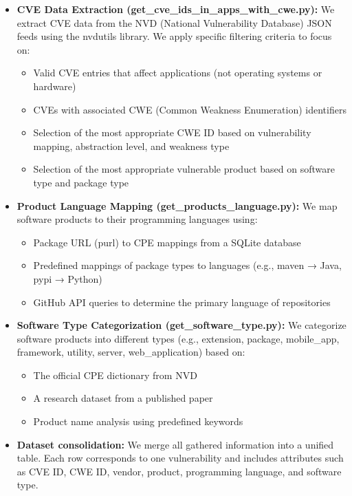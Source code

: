 \begin{itemize}
    \item \textbf{CVE Data Extraction (get\_cve\_ids\_in\_apps\_with\_cwe.py):} We extract CVE data from the NVD (National Vulnerability Database) JSON feeds using the nvdutils library. We apply specific filtering criteria to focus on:
    \begin{itemize}
        \item Valid CVE entries that affect applications (not operating systems or hardware)
        \item CVEs with associated CWE (Common Weakness Enumeration) identifiers
        \item Selection of the most appropriate CWE ID based on vulnerability mapping, abstraction level, and weakness type
        \item Selection of the most appropriate vulnerable product based on software type and package type
    \end{itemize}
    
    \item \textbf{Product Language Mapping (get\_products\_language.py):} We map software products to their programming languages using:
    \begin{itemize}
        \item Package URL (purl) to CPE mappings from a SQLite database
        \item Predefined mappings of package types to languages (e.g., maven → Java, pypi → Python)
        \item GitHub API queries to determine the primary language of repositories
    \end{itemize}
    
    \item \textbf{Software Type Categorization (get\_software\_type.py):} We categorize software products into different types (e.g., extension, package, mobile\_app, framework, utility, server, web\_application) based on:
    \begin{itemize}
        \item The official CPE dictionary from NVD
        \item A research dataset from a published paper
        \item Product name analysis using predefined keywords
    \end{itemize}
    
    \item \textbf{Dataset consolidation:} We merge all gathered information into a unified table. Each row corresponds to one vulnerability and includes attributes such as CVE ID, CWE ID, vendor, product, programming language, and software type.
\end{itemize}


